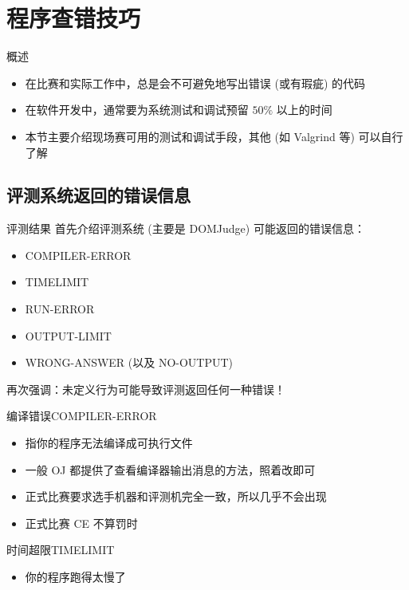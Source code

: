 \documentclass[10pt,mathserif]{beamer}
\begin{document}
\section{程序查错技巧}
\sectionpage

\begin{frame}{概述}
	\begin{itemize}
		\item 在比赛和实际工作中，总是会不可避免地写出错误 (或有瑕疵) 的代码
		\item 在软件开发中，通常要为系统测试和调试预留 $50\%$ 以上的时间
		\item 本节主要介绍现场赛可用的测试和调试手段，其他 (如 Valgrind 等) 可以自行了解
	\end{itemize}
\end{frame}

\subsection{评测系统返回的错误信息}

\begin{frame}{评测结果}
	首先介绍评测系统 (主要是 DOMJudge) 可能返回的错误信息：
	\begin{itemize}
		\item COMPILER-ERROR
		\item TIMELIMIT
		\item RUN-ERROR
		\item OUTPUT-LIMIT
		\item WRONG-ANSWER (以及 NO-OUTPUT)
	\end{itemize}
	再次强调：未定义行为可能导致评测返回任何一种错误！
\end{frame}

\begin{frame}{编译错误}{COMPILER-ERROR}
	\begin{itemize}
		\item 指你的程序无法编译成可执行文件
		\item 一般 OJ 都提供了查看编译器输出消息的方法，照着改即可
		\item 正式比赛要求选手机器和评测机完全一致，所以几乎不会出现
		\item 正式比赛 CE 不算罚时
	\end{itemize}
\end{frame}

\begin{frame}{时间超限}{TIMELIMIT}
	\begin{itemize}
		\item 你的程序跑得太慢了
	\end{itemize}
\end{frame}
\end{document}
